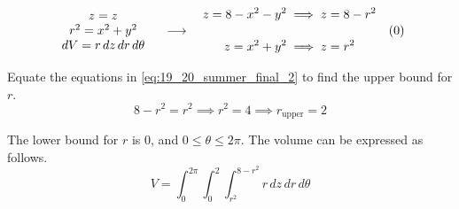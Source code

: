 \documentclass[a4paper, 12pt]{article}
\begin{document}
\begin{enumerate}[leftmargin=*,label=\textbf{\arabic*.}]
\begin{enumerate}[leftmargin=*,label=\textbf{\alph*.}]
\[
\begin{array}{c}
z=z\\
r^2=x^2+y^2\\
dV=r\,dz\,dr\,d\theta
\end{array}
\quad\longrightarrow\quad
\begin{aligned}
z=8-x^2-y^2
&\implies z=8-r^2\\[1em]
z=x^2+y^2
&\implies z=r^2
\end{aligned}
\quad
\vcenter{\hbox{(\theequation)}}
\]

Equate the equations in \eqref{eq:19_20_summer_final_2} to find the upper bound for $r$.
\[8-r^2=r^2\implies r^2=4\implies r_{\text{upper}}=2\]

The lower bound for $r$ is 0, and $0\leq\theta\leq2\pi$. The volume can be expressed as follows.
\[\boxed{V=\int_0^{2\pi}\int_0^2\int_{r^2}^{8-r^2}r\,dz\,dr\,d\theta}\]

\end{enumerate}
\end{enumerate}

\newpage
{}
{}


\end{document}
